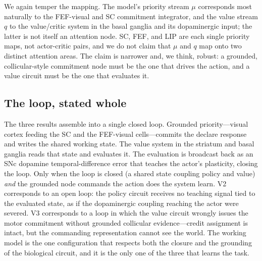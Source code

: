 We again temper the mapping. The model's priority stream $\mu$ corresponds most naturally to the FEF-visual and SC commitment integrator, and the value stream $q$ to the value/critic system in the basal ganglia and its dopaminergic input; the latter is not itself an attention node. SC, FEF, and LIP are each single priority maps, not actor-critic pairs, and we do not claim that $\mu$ and $q$ map onto two distinct attention areas. The claim is narrower and, we think, robust: a grounded, collicular-style commitment node must be the one that drives the action, and a value circuit must be the one that evaluates it.

\subsection{The loop, stated whole}

The three results assemble into a single closed loop. Grounded priority---visual cortex feeding the SC and the FEF-visual cells---commits the declare response and writes the shared working state. The value system in the striatum and basal ganglia reads that state and evaluates it. The evaluation is broadcast back as an SNc dopamine temporal-difference error that teaches the actor's plasticity, closing the loop. Only when the loop is closed (a shared state coupling policy and value) \emph{and} the grounded node commands the action does the system learn. V2 corresponds to an open loop: the policy circuit receives no teaching signal tied to the evaluated state, as if the dopaminergic coupling reaching the actor were severed. V3 corresponds to a loop in which the value circuit wrongly issues the motor commitment without grounded collicular evidence---credit assignment is intact, but the commanding representation cannot see the world. The working model is the one configuration that respects both the closure and the grounding of the biological circuit, and it is the only one of the three that learns the task.
